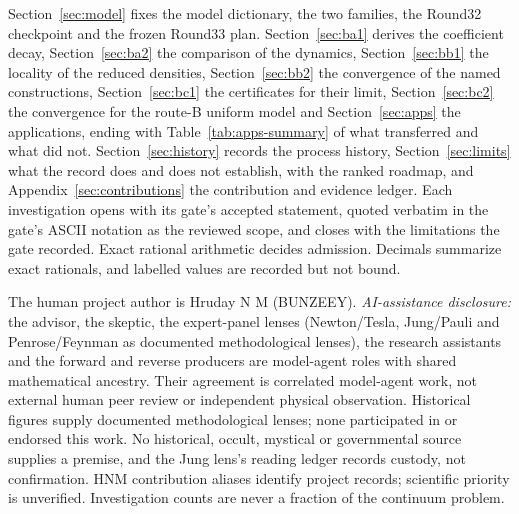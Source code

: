 \documentclass[11pt,a4paper]{article}
\begin{document}
Section~\ref{sec:model} fixes the model dictionary, the two families, the
Round32 checkpoint and the frozen Round33 plan. Section~\ref{sec:ba1} derives
the coefficient decay, Section~\ref{sec:ba2} the comparison of the dynamics,
Section~\ref{sec:bb1} the locality of the reduced densities,
Section~\ref{sec:bb2} the convergence of the named constructions,
Section~\ref{sec:bc1} the certificates for their limit,
Section~\ref{sec:bc2} the convergence for the route-B uniform model and
Section~\ref{sec:apps} the applications, ending with
Table~\ref{tab:apps-summary} of what transferred and what did not.
Section~\ref{sec:history} records the process history,
Section~\ref{sec:limits} what the record does and does not establish, with
the ranked roadmap, and Appendix~\ref{sec:contributions} the contribution and
evidence ledger. Each
investigation opens with its gate's accepted statement, quoted
verbatim in the gate's ASCII notation as the reviewed scope, and closes with
the limitations the gate recorded. Exact rational arithmetic decides
admission. Decimals summarize exact rationals, and labelled values are
recorded but not bound.

The human project author is Hruday N M (BUNZEEY). \emph{AI-assistance
disclosure:} the advisor, the skeptic, the expert-panel lenses (Newton/Tesla,
Jung/Pauli and Penrose/Feynman as documented methodological lenses), the
research assistants and the forward and reverse producers are model-agent
roles with shared mathematical ancestry. Their agreement is correlated
model-agent work, not external human peer review or independent physical
observation. Historical figures supply documented methodological lenses; none
participated in or endorsed this work. No historical, occult, mystical or
governmental source supplies a premise, and the Jung lens's reading ledger
records custody, not confirmation. HNM contribution aliases identify project
records; scientific priority is unverified. Investigation counts are never a
fraction of the continuum problem.
\end{document}
